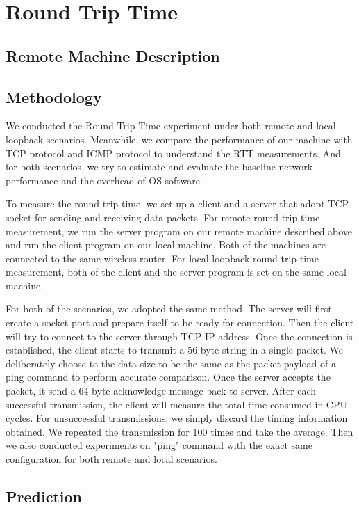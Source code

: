 \newpage
\section{Round Trip Time}
\label{RTT}
\subsection{Remote Machine Description}

\subsection{Methodology}

We conducted the Round Trip Time experiment under both remote and local loopback scenarios. Meanwhile, we compare the performance of our machine with TCP protocol and ICMP protocol to understand the RTT measurements.  And for both scenarios, we try to estimate and evaluate the baseline network performance and the overhead of OS software. 

To measure the round trip time, we set up a client and a server that adopt TCP socket for sending and receiving data packets. For remote round trip time measurement, we run the server program on our remote machine described above and run the client program on our local machine. Both of the machines are connected to the same wireless router. For local loopback round trip time measurement, both of the client and the server program is set on the same local machine. 

For both of the scenarios, we adopted the same method. The server will first create a socket port and prepare itself to be ready for connection. Then the client will try to connect to the server through TCP IP address. Once the connection is established, the client starts to transmit a 56 byte string in a single packet. We deliberately choose to the data size to be the same as the packet payload of a ping command to perform accurate comparison. Once the server accepts the packet, it send a 64 byte acknowledge message back to server. After each successful transmission, the client will measure the total time consumed in CPU cycles. For unsuccessful transmissions, we simply discard the timing information obtained. We repeated the transmission for 100 times and take the average. Then we also conducted experiments on "ping" command with the exact same configuration for both remote and local scenarios. 

\subsection{Prediction}

